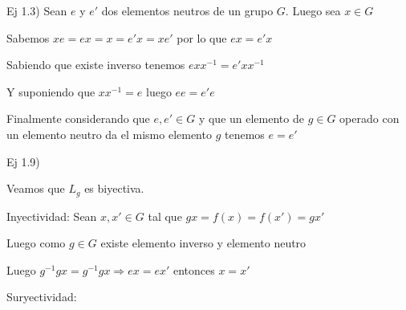 \documentclass[12pt]{article}
\begin{document}
Ej 1.3)
Sean $e$ y $e'$ dos elementos neutros de un grupo $G$. Luego sea $x \in G$

Sabemos $xe = ex = x = e'x = xe'$ por lo que $ex = e'x$ 

Sabiendo que existe inverso tenemos $exx^{-1} = e'xx^{-1}$

Y suponiendo que $xx^{-1} = e$ luego $ee = e'e$

Finalmente considerando que $e, e' \in G$ y que un elemento de $g \in G$ operado con un elemento neutro da el mismo elemento $g$ tenemos $e = e'$

Ej 1.9)

Veamos que $L_{g}$ es biyectiva.

Inyectividad: Sean $x , x' \in G$ tal que $gx = f(x) = f(x') = gx'$

Luego como $g \in G$ existe elemento inverso y elemento neutro

Luego $g^{-1}gx = g^{-1}gx \Rightarrow ex = ex' $ entonces $x = x'$

Suryectividad: 
\end{document}
